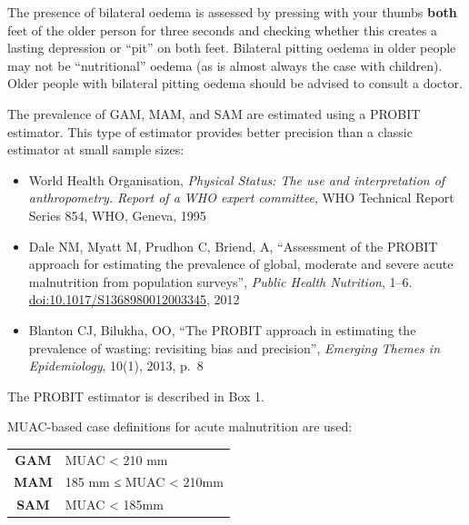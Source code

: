 \documentclass[12pt,a4paper]{book}
\theoremstyle{definition}
\theoremstyle{definition}
\theoremstyle{definition}
\theoremstyle{remark}
\begin{document}
The presence of bilateral oedema is assessed by pressing with your
thumbs \textbf{both} feet of the older person for three seconds and
checking whether this creates a lasting depression or ``pit'' on both
feet. Bilateral pitting oedema in older people may not be
``nutritional'' oedema (as is almost always the case with children).
Older people with bilateral pitting oedema should be advised to consult
a doctor.

The prevalence of GAM, MAM, and SAM are estimated using a PROBIT
estimator. This type of estimator provides better precision than a
classic estimator at small sample sizes:

\begin{itemize}
\item
  World Health Organisation, \emph{Physical Status: The use and
  interpretation of anthropometry. Report of a WHO expert committee},
  WHO Technical Report Series 854, WHO, Geneva, 1995
\item
  Dale NM, Myatt M, Prudhon C, Briend, A, ``Assessment of the PROBIT
  approach for estimating the prevalence of global, moderate and severe
  acute malnutrition from population surveys'', \emph{Public Health
  Nutrition}, 1--6. \url{doi:10.1017/S1368980012003345}, 2012
\item
  Blanton CJ, Bilukha, OO, ``The PROBIT approach in estimating the
  prevalence of wasting: revisiting bias and precision'', \emph{Emerging
  Themes in Epidemiology}, 10(1), 2013, p.~8
\end{itemize}

The PROBIT estimator is described in Box 1.

MUAC-based case definitions for acute malnutrition are used:

\begin{longtable}[]{@{}cl@{}}
\toprule
\begin{minipage}[t]{0.48\columnwidth}\centering
\textbf{GAM}\strut
\end{minipage} & \begin{minipage}[t]{0.48\columnwidth}\raggedright
MUAC \textless{} 210 mm\strut
\end{minipage}\tabularnewline
\begin{minipage}[t]{0.48\columnwidth}\centering
\textbf{MAM}\strut
\end{minipage} & \begin{minipage}[t]{0.48\columnwidth}\raggedright
185 mm ≤ MUAC \textless{} 210mm\strut
\end{minipage}\tabularnewline
\begin{minipage}[t]{0.48\columnwidth}\centering
\textbf{SAM}\strut
\end{minipage} & \begin{minipage}[t]{0.48\columnwidth}\raggedright
MUAC \textless{} 185mm\strut
\end{minipage}\tabularnewline
\bottomrule
\end{longtable}
\end{document}
